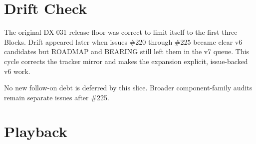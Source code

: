 \section{Drift Check}\label{record-092-drift-check}

The original DX-031 release floor was correct to limit itself to the first three Blocks. Drift appeared later when issues \#220 through \#225 became clear v6 candidates but ROADMAP and BEARING still left them in the v7 queue. This cycle corrects the tracker mirror and makes the expansion explicit, issue-backed v6 work.

No new follow-on debt is deferred by this slice. Broader component-family audits remain separate issues after \#225.

\section{Playback}\label{record-092-playback}

